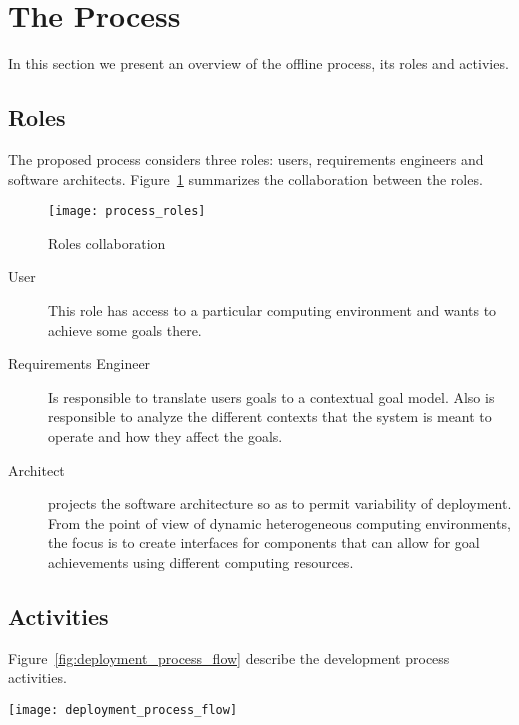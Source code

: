 \section{The Process}

In this section we present an overview of the offline process, its roles and activies.

\subsection{Roles}
The proposed process considers three roles: users, requirements engineers and software architects.
Figure~\ref{fig:process_roles} summarizes the collaboration between the roles.

 \begin{figure}[!htb]
   \centering
   \texttt{[image: process\_roles]}
   \caption{Roles collaboration}
 \label{fig:process_roles}
 \end{figure}

\begin{description}
  \item[User]
  This role has access to a particular computing environment and wants to achieve some goals there.
  \item[Requirements Engineer]
  Is responsible to translate users goals to a contextual goal model. Also is responsible to analyze the different contexts that the system is meant to operate and how they affect the goals.
  \item[Architect] projects the software architecture so as to permit variability of deployment.
  From the point of view of dynamic heterogeneous computing environments, the focus is to create interfaces for components that can allow for goal achievements using different computing resources.

\end{description}



\subsection{Activities}

Figure~\ref{fig:deployment_process_flow} describe the development process activities.

\label{sub:Proposal}
\begin{figure*}[!htb]
  \centering
  \texttt{[image: deployment\_process\_flow]}
  \caption{Deployment Process Activities}
\label{fig:deployment_process_flow}
\end{figure*}

